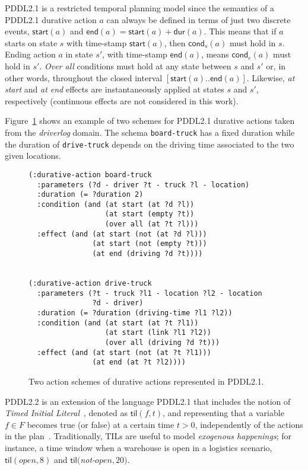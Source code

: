 \documentclass{ecai}
\newcommand{\cond}{\mathsf{cond}}  %
\newcommand{\dur}{\mathsf{dur}}    %
\newcommand{\start}{\mathsf{start}}%
\newcommand{\en}{\mathsf{end}}     %
\newcommand{\til}{\mathsf{til}}    %
\begin{document}
PDDL2.1 is a restricted temporal planning model since the semantics of a PDDL2.1 durative action $a$ can always be defined in terms of just two discrete events, $\start(a)$ and $\en(a)=\start(a)+\dur(a)$. This means that if $a$ starts on state $s$ with time-stamp $\start(a)$, then $\cond_s(a)$ must hold in $s$. Ending action $a$ in state $s'$, with time-stamp $\en(a)$, means $\cond_e(a)$ must hold in $s'$. {\em Over all} conditions must hold at any state between $s$ and $s'$ or, in other words, throughout the closed interval $[\start(a)..\en(a)]$. Likewise, {\em at start} and {\em at end} effects are instantaneously applied at states $s$ and $s'$, respectively (continuous effects are not considered in this work).

Figure~\ref{fig:exampleactions2} shows an example of two schemes for PDDL2.1 durative actions taken from the {\em driverlog} domain. The schema \texttt{board-truck} has a fixed duration while the duration of \texttt{drive-truck} depends on the driving time associated to the two given locations.

\begin{figure}
\begin{scriptsize}    
\begin{verbatim}
(:durative-action board-truck
  :parameters (?d - driver ?t - truck ?l - location)
  :duration (= ?duration 2)
  :condition (and (at start (at ?d ?l)) 
                  (at start (empty ?t))
                  (over all (at ?t ?l)))
  :effect (and (at start (not (at ?d ?l))) 
               (at start (not (empty ?t)))
               (at end (driving ?d ?t))))


(:durative-action drive-truck
  :parameters (?t - truck ?l1 - location ?l2 - location 
               ?d - driver)
  :duration (= ?duration (driving-time ?l1 ?l2))
  :condition (and (at start (at ?t ?l1)) 
                  (at start (link ?l1 ?l2))
                  (over all (driving ?d ?t)))
  :effect (and (at start (not (at ?t ?l1))) 
               (at end (at ?t ?l2))))
\end{verbatim}
\end{scriptsize}    
\caption{Two action schemes of durative actions represented in PDDL2.1.}
\label{fig:exampleactions2}
\end{figure}

PDDL2.2 is an extension of the language PDDL2.1 that includes the notion of {\em Timed Initial Literal}~\cite{hoffmann2005}, denoted as $\til(f,t)$, and representing that a variable $f\in F$ becomes true (or false) at a certain time $t>0$, independently of the actions in the plan~\cite{Edelkamp04}. Traditionally, TILs are useful to model {\em exogenous happenings}; for instance, a time window when a warehouse is open in a logistics scenario, $\til(open,8)$ and $\til($\textit{not-}$open,20)$.
\end{document}
